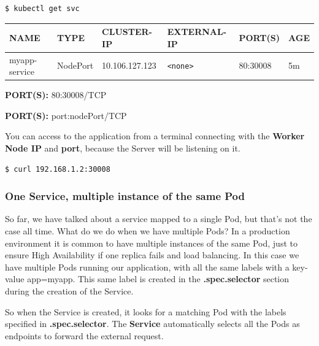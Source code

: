 \documentclass{article}
\newenvironment{codetemplate}[1][]{%
  \mybasecolorbox[#1]
  \itshape
}{%
  \endmybasecolorbox
}
\begin{document}
\begin{codetemplate}{}
\begin{verbatim}
$ kubectl get svc
\end{verbatim}
\end{codetemplate}

\begin{table}[H]
\begin{tabular}{| m{3cm} | m{2cm} | m{2.5cm} | m{2.7cm} | m{2cm} | m{1.2cm} |}
\hline
\textbf{NAME} & \textbf{TYPE} & \textbf{CLUSTER-IP} & \textbf{EXTERNAL-IP} & \textbf{PORT(S)} & \textbf{AGE} \\ \hline
myapp-service & NodePort & 10.106.127.123 & \verb|<none>| & 80:30008 & 5m \\ \hline
\end{tabular}
\end{table}

\textbf{PORT(S):} 80:30008/TCP

\textbf{PORT(S):} port:nodePort/TCP

You can access to the application from a terminal connecting with the \textbf{Worker Node IP} and \textbf{port}, because the Server will be listening on it.

\begin{codetemplate}{}
\begin{verbatim}
$ curl 192.168.1.2:30008
\end{verbatim}
\end{codetemplate}

\subsubsection{One Service, multiple instance of the same Pod}

So far, we have talked about a service mapped to a single Pod, but that's not the case all time. What do we do when we have multiple Pods? In a production environment it is common to have multiple instances of the same Pod, just to ensure High Availability if one replica fails and load balancing. In this case we have multiple Pods running our application, with all the same labels with a key-value app=myapp. This same label is created in the \textbf{.spec.selector} section during the creation of the Service.

So when the Service is created, it looks for a matching Pod with the labels specified in \textbf{.spec.selector}. The \textbf{Service} automatically selects all the Pods as endpoints to forward the external request.
\end{document}
